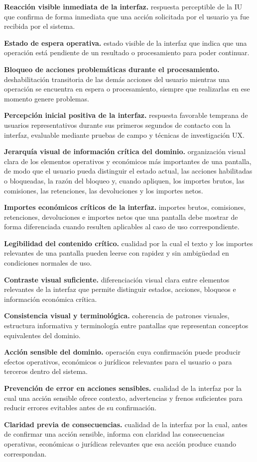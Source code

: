 \documentclass[10pt,letterpaper]{article}
\begin{document}
\noindent\textbf{Reacción visible inmediata de la interfaz.} respuesta perceptible de la IU que confirma de forma inmediata que una acción solicitada por el usuario ya fue recibida por el sistema.\par
\noindent\textbf{Estado de espera operativa.} estado visible de la interfaz que indica que una operación está pendiente de un resultado o procesamiento para poder continuar.\par
\noindent\textbf{Bloqueo de acciones problemáticas durante el procesamiento.} deshabilitación transitoria de las demás acciones del usuario mientras una operación se encuentra en espera o procesamiento, siempre que realizarlas en ese momento genere problemas.\par
\noindent\textbf{Percepción inicial positiva de la interfaz.} respuesta favorable temprana de usuarios representativos durante sus primeros segundos de contacto con la interfaz, evaluable mediante pruebas de campo y técnicas de investigación UX.\par
\noindent\textbf{Jerarquía visual de información crítica del dominio.} organización visual clara de los elementos operativos y económicos más importantes de una pantalla, de modo que el usuario pueda distinguir el estado actual, las acciones habilitadas o bloqueadas, la razón del bloqueo y, cuando apliquen, los importes brutos, las comisiones, las retenciones, las devoluciones y los importes netos.\par
\noindent\textbf{Importes económicos críticos de la interfaz.} importes brutos, comisiones, retenciones, devoluciones e importes netos que una pantalla debe mostrar de forma diferenciada cuando resulten aplicables al caso de uso correspondiente.\par
\noindent\textbf{Legibilidad del contenido crítico.} cualidad por la cual el texto y los importes relevantes de una pantalla pueden leerse con rapidez y sin ambigüedad en condiciones normales de uso.\par
\noindent\textbf{Contraste visual suficiente.} diferenciación visual clara entre elementos relevantes de la interfaz que permite distinguir estados, acciones, bloqueos e información económica crítica.\par
\noindent\textbf{Consistencia visual y terminológica.} coherencia de patrones visuales, estructura informativa y terminología entre pantallas que representan conceptos equivalentes del dominio.\par
\noindent\textbf{Acción sensible del dominio.} operación cuya confirmación puede producir efectos operativos, económicos o jurídicos relevantes para el usuario o para terceros dentro del sistema.\par
\noindent\textbf{Prevención de error en acciones sensibles.} cualidad de la interfaz por la cual una acción sensible ofrece contexto, advertencias y frenos suficientes para reducir errores evitables antes de su confirmación.\par
\noindent\textbf{Claridad previa de consecuencias.} cualidad de la interfaz por la cual, antes de confirmar una acción sensible, informa con claridad las consecuencias operativas, económicas o jurídicas relevantes que esa acción produce cuando correspondan.\par
\end{document}
